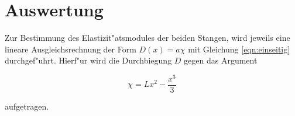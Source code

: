 \section{Auswertung}
	\label{sec:auswertung}
	Zur Bestimmung des Elastizit"atsmodules der beiden Stangen, wird jeweils eine lineare Ausgleichsrechnung der Form $D(x) = a\chi$ mit Gleichung \eqref{eqn:einseitig} durchgef"uhrt.
	Hierf"ur wird die Durchbiegung $D$ gegen das Argument

	\begin{equation}
		\chi = Lx^2 - \frac{x^3}{3}
	\end{equation}

	aufgetragen.
